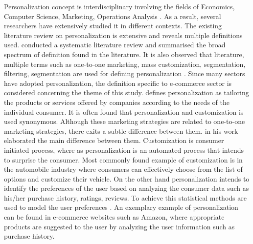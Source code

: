 Personalization concept is interdisciplinary involving the fields of Economics, Computer Science, Marketing, Operations Analysis \autocite[1344]{Murthi2003}. As a result, several researchers have extensively studied it in different contexts. The existing literature review on personalization is extensive and reveals multiple definitions used. \textcite[412]{Vesanen2007} conducted a systematic literature review and summarised the broad spectrum of definition found in the literature. It is also observed that literature, multiple terms such as one-to-one marketing, mass customization, segmentation, filtering, segmentation are used for defining personalization \autocite[2]{Montgomery2009}. Since many sectors have adopted personalization, the definition specific to e-commerce sector is considered concerning the theme of this study.\textcite[305]{Arora2008} defines personalization as tailoring the products or services offered by companies according to the needs of the individual consumer. It is often found that personalization and customization is used synonymous. Although these marketing strategies are related to one-to-one marketing strategies, there exits a subtle difference between them. \textcite[538]{Kumar2007} in his work elaborated the main difference between them. Customization is consumer initiated process, where as personalization is an automated process that intends to surprise the consumer. Most commonly found example of customization is in the automobile industry where consumers can effectively choose from the list of options and customize their vehicle. On the other hand personalization intends to identify the preferences of the user based on analyzing the consumer data such as his/her purchase history, ratings, reviews. To achieve this statistical methods are used to model the user preferences \autocite[310]{Arora2008}. An exemplary example of personalization can be found in e-commerce websites such as Amazon, where appropriate products are suggested to the user by analyzing the user information such as purchase history. \\ \par


